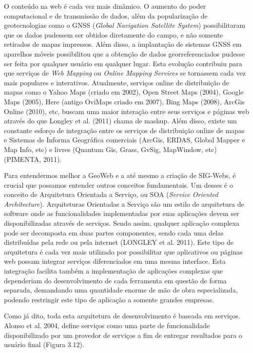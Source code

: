 		O conteúdo na web é cada vez mais dinâmico. O aumento do poder computacional e de transmissão de dados, além da popularização de geotecnologias como o GNSS (\textit{Global Navigation Satellite System}) possibilitaram que os dados pudessem ser obtidos diretamente do campo, e não somente retirados de mapas impressos. Além disso, a implantação de sistemas GNSS em aparelhos móveis possibilitou que a obtenção de dados georreferenciados pudesse ser feita por qualquer usuário em qualquer lugar. Esta evolução contribuiu para que serviços de \textit{Web Mapping} ou \textit{Online Mapping Services} se tornassem cada vez mais populares e interativos. Atualmente, serviços online de distribuição de mapas como o Yahoo Maps (criado em 2002), Open Street Maps (2004), Google Maps (2005), Here (antigo OviMaps criado em 2007), Bing Maps (2008), ArcGis Online (2010), etc, buscam uma maior interação entre seus serviços e páginas web através do que Longley et al. (2011) chama de mashup. Além disso, existe um constante esforço de integração entre os serviços de distribuição online de mapas e Sistemas de Informa Geográfica comerciais (ArcGis, ERDAS, Global Mapper e Map Info, etc) e livres (Quantum Gis, Grass, GvSig, MapWindow, etc) (PIMENTA, 2011).
		
		Para entendermos melhor a GeoWeb e a até mesmo a criação de SIG-Webs, é crucial que possamos entender outros conceitos fundamentais. Um desses é o conceito de Arquitetura Orientada a Serviço, ou SOA (\textit{Service Oriented Architecture}). Arquiteturas Orientadas a Serviço são um estilo de arquitetura de software onde as funcionalidades implementadas por suas aplicações devem ser disponibilizadas através de serviços. Sendo assim, qualquer aplicação complexa pode ser decomposta em duas partes componentes, sendo cada uma delas distribuídas pela rede ou pela internet (LONGLEY et al. 2011). Este tipo de arquitetura é cada vez mais utilizado por possibilitar que aplicativos ou páginas web possam integrar serviços diferenciados em uma mesma interface. Esta integração facilita também a implementação de aplicações complexas que dependeriam do desenvolvimento de cada ferramenta em questão de forma separada, demandando uma quantidade enorme de mão de obra especializada, podendo restringir este tipo de aplicação a somente grandes empresas.
		
		Como já dito, toda esta arquitetura de desenvolvimento é baseada em serviços. Alonso et al. 2004, define serviços como uma parte de funcionalidade disponibilizado por um provedor de serviços a fim de entregar resultados para o usuário final (Figura 3.12).
		
